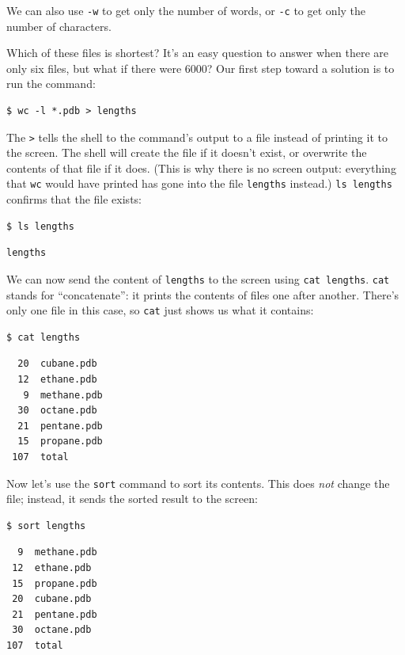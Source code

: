 \documentclass{book}
\begin{document}
We can also use \texttt{-w} to get only the number of words, or
\texttt{-c} to get only the number of characters.

Which of these files is shortest? It's an easy question to answer when
there are only six files, but what if there were 6000? Our first step
toward a solution is to run the command:

\begin{verbatim}
$ wc -l *.pdb > lengths
\end{verbatim}

The \texttt{\textgreater{}} tells the shell to
 the command's output to a file instead
of printing it to the screen. The shell will create the file if it
doesn't exist, or overwrite the contents of that file if it does. (This
is why there is no screen output: everything that \texttt{wc} would have
printed has gone into the file \texttt{lengths} instead.)
\texttt{ls lengths} confirms that the file exists:

\begin{verbatim}
$ ls lengths
\end{verbatim}

\begin{verbatim}
lengths
\end{verbatim}

We can now send the content of \texttt{lengths} to the screen using
\texttt{cat lengths}. \texttt{cat} stands for ``concatenate'': it prints
the contents of files one after another. There's only one file in this
case, so \texttt{cat} just shows us what it contains:

\begin{verbatim}
$ cat lengths
\end{verbatim}

\begin{verbatim}
  20  cubane.pdb
  12  ethane.pdb
   9  methane.pdb
  30  octane.pdb
  21  pentane.pdb
  15  propane.pdb
 107  total
\end{verbatim}

Now let's use the \texttt{sort} command to sort its contents. This does
\emph{not} change the file; instead, it sends the sorted result to the
screen:

\begin{verbatim}
$ sort lengths
\end{verbatim}

\begin{verbatim}
  9  methane.pdb
 12  ethane.pdb
 15  propane.pdb
 20  cubane.pdb
 21  pentane.pdb
 30  octane.pdb
107  total
\end{verbatim}
\end{document}
